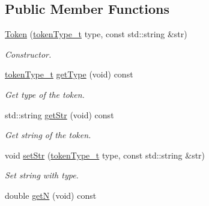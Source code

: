 \subsection*{Public Member Functions}
\begin{DoxyCompactItemize}
\item 
\hyperlink{class_token_a873561c98ca3fb50206e588b53ea2a35}{Token} (\hyperlink{class_token_af5797fcd4cb63823f3108625cbb83d11}{token\+Type\+\_\+t} type, const std\+::string \&str)
\begin{DoxyCompactList}\small\item\em Constructor. \end{DoxyCompactList}\item 
\hypertarget{class_token_a005b392d2172bc09aa302390506bbac4}{}\hyperlink{class_token_af5797fcd4cb63823f3108625cbb83d11}{token\+Type\+\_\+t} \hyperlink{class_token_a005b392d2172bc09aa302390506bbac4}{get\+Type} (void) const \label{class_token_a005b392d2172bc09aa302390506bbac4}

\begin{DoxyCompactList}\small\item\em Get type of the token. \end{DoxyCompactList}\item 
\hypertarget{class_token_ad38a4d20573a9c6c4bc2447a4701b51d}{}std\+::string \hyperlink{class_token_ad38a4d20573a9c6c4bc2447a4701b51d}{get\+Str} (void) const \label{class_token_ad38a4d20573a9c6c4bc2447a4701b51d}

\begin{DoxyCompactList}\small\item\em Get string of the token. \end{DoxyCompactList}\item 
\hypertarget{class_token_ae18998013091dea4eb553ec55f957562}{}void \hyperlink{class_token_ae18998013091dea4eb553ec55f957562}{set\+Str} (\hyperlink{class_token_af5797fcd4cb63823f3108625cbb83d11}{token\+Type\+\_\+t} type, const std\+::string \&str)\label{class_token_ae18998013091dea4eb553ec55f957562}

\begin{DoxyCompactList}\small\item\em Set string with type. \end{DoxyCompactList}\item 
\hypertarget{class_token_a2d5c2dc14215b3b443b3ba16d12a49aa}{}double \hyperlink{class_token_a2d5c2dc14215b3b443b3ba16d12a49aa}{get\+N} (void) const \label{class_token_a2d5c2dc14215b3b443b3ba16d12a49aa}


\end{DoxyCompactItemize}
